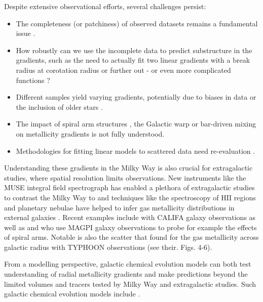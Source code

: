 \documentclass[fleqn,usenatbib]{mnras}
\begin{document}
Despite extensive observational efforts, several challenges persist:
\begin{itemize}
    \item The completeness (or patchiness) of observed datasets remains a fundamental issue \citep{Bergemann2014}.
    \item How robustly can we use the incomplete data to predict substructure in the gradients, such as the need to actually fit two linear gradients with a break radius at corotation radius \citep[][and references therein]{Bresolin2012} or further out \citep{Donor2020} - or even more complicated functions \citep[see e.g.][]{Chiappini2001, Kubryk2015}?
    \item Different samples yield varying gradients, potentially due to biases in data or the inclusion of older stars \citep[e.g.][]{Boeche2013, AllendePrieto2006, Katz2011, Hayden2014, Anders2014, Vickers2021, Willett2023}.
    \item The impact of spiral arm structures \citep{Poggio2021}, the Galactic warp \citep{Lemasle2022} or bar-driven mixing \citep{DiMatteo2013} on metallicity gradients is not fully understood.
    \item Methodologies for fitting linear models to scattered data need re-evaluation \citep{Metha2021}.
\end{itemize}

Understanding these gradients in the Milky Way is also crucial for extragalactic studies, where spatial resolution limits observations. New instruments like the MUSE integral field spectrograph has enabled a plethora of extragalactic studies to contrast the Milky Way to and techniques like the spectroscopy of HII regions and planetary nebulae have helped to infer gas metallicity distributions in external galaxies \citep{Shaver1983, Vilchez1996, Rolleston2000, Bresolin2012}. Recent examples include \citet{Sanchez2014} with CALIFA galaxy observations as well as \citet{Mun2024} and \citet{Chen2024} who use MAGPI galaxy observations to probe for example the effects of spiral arms. Notable is also the scatter that \citet{Chen2023} found for the gas metallicity across galactic radius with TYPHOON observations (see their. Figs. 4-6).

From a modelling perspective, galactic chemical evolution models can both test understanding of radial metallicity gradients and make predictions beyond the limited volumes and tracers tested by Milky Way and extragalactic studies. Such galactic chemical evolution models include \citet{Chiappini2001, Minchev2014b, Kubryk2015, Stanghellini2015, Matteucci2001b}.
\end{document}
